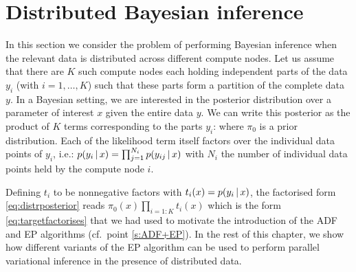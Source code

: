 

\section{Distributed Bayesian inference}

In this section we consider the problem of performing Bayesian inference when the relevant data is distributed across different compute nodes. 
Let us assume that there are $K$ such compute nodes each holding independent parts of the data $y_i$ (with $i=1,\dots,K$) such that these parts form a partition of the complete data $y$. 
In a Bayesian setting, we are interested in the posterior distribution over a parameter of interest $x$ given the entire data $y$. We can write this posterior as the product of $K$ terms corresponding to the parts $y_i$: 
%
%
where $\pi_0$ is a prior distribution. Each of the likelihood term itself factors over the individual data points of $y_i$, i.e.: $p(y_i\,|\, x)=\prod_{j=1}^{N_i}p(y_{ij}\,|\, x)$ with $N_i$ the number of individual data points held by the compute node $i$.


Defining $t_i$ to be nonnegative factors with $t_i(x)=p(y_i\,|\, x)$, the factorised form \eqref{eq:distrposterior} reads $\pi_0(x)\prod_{i=1:K}t_i(x)$ which is the form \eqref{eq:targetfactorises} that we had used to motivate the introduction of the ADF and EP algorithms (cf.\ point \ref{s:ADF+EP}).
In the rest of this chapter, we show how different variants of the EP algorithm can be used to perform parallel variational inference in the presence of distributed data. 


